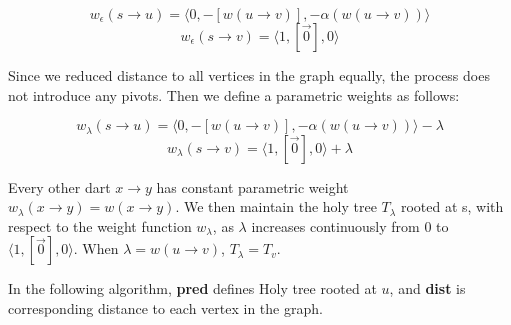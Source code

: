 \documentclass{article}
\begin{document}
\[ w_{\epsilon}(s \rightarrow u) = \langle 0, -[w(u \rightarrow v)], 
  -\alpha(w(u \rightarrow v)) \rangle \]
\[ w_{\epsilon}(s \rightarrow v) = \langle 1, [\vec{0}], 0 \rangle \]

Since we reduced distance to all vertices in the graph equally, the process does
not introduce any pivots. Then we define a parametric weights as follows:

\[ w_{\lambda}(s \rightarrow u) = \langle 0, -[w(u \rightarrow v)], 
  -\alpha(w(u \rightarrow v)) \rangle - \lambda \]
\[ w_{\lambda}(s \rightarrow v) =  \langle 1, [\vec{0}], 0 \rangle  + \lambda \]

Every other dart $x \rightarrow y$ has constant parametric weight 
$w_{\lambda}(x \rightarrow y) = w(x \rightarrow y)$.
We then maintain the holy tree $T_{\lambda}$ rooted at s, with respect
to the weight function $w_{\lambda}$, as $\lambda$ increases continuously from
0 to $\langle 1, [\vec{0}], 0 \rangle$. When $\lambda = w(u \rightarrow v)$, 
$T_{\lambda} = T_v$.

In the following algorithm, \textbf{pred} defines Holy tree rooted at $u$, and 
\textbf{dist} is corresponding distance to each vertex in the graph. \\

\end{document}
